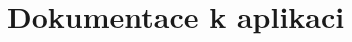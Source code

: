 \documentclass[a4paper,oneside,12pt]{book}
\begin{document}
\newpage %
\appendix %


\chapter{Dokumentace k aplikaci} %
%
\end{document}
